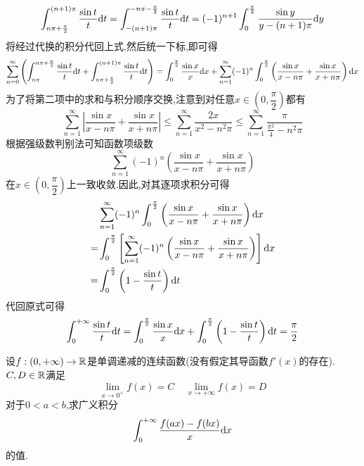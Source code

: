 \documentclass{ctexart}
\begin{document}
\begin{solution}
\begin{enumerate}[label=\tbf{(\arabic*)},topsep=0pt,parsep=0pt,itemsep=0pt,partopsep=0pt]
            \[\int_{n\pi+\frac\pi2}^{(n+1)\pi}\dfrac{\sin t}{t}\mathrm{d} t
            =\int^{-n\pi-\frac\pi2}_{-(n+1)\pi}\dfrac{\sin t}{t}\mathrm{d} t
            =(-1)^{n+1}\int_0^{\frac\pi2}\dfrac{\sin y}{y-(n+1)\pi}\mathrm{d} y\]
            将经过代换的积分代回上式,然后统一下标,即可得
            \[\sum_{n=0}^{\infty}\left(\int_{n\pi}^{n\pi+\frac\pi2}\dfrac{\sin t}{t}\mathrm{d} t+\int_{n\pi+\frac\pi2}^{(n+1)\pi}\dfrac{\sin t}{t}\mathrm{d} t\right)
            =\int_0^{\frac\pi2}\dfrac{\sin x}{x}\mathrm{d} x+\sum_{n=1}^{\infty}(-1)^n\int_0^{\frac\pi2}\left(\dfrac{\sin x}{x-n\pi}+\dfrac{\sin x}{x+n\pi}\right)\mathrm{d} x\]
            为了将第二项中的求和与积分顺序交换,注意到对任意$x\in\left(0,\dfrac\pi2\right)$都有
            \[\sum_{n=1}^{\infty}\left|\dfrac{\sin x}{x-n\pi}+\dfrac{\sin x}{x+n\pi}\right|
            \leqslant\sum_{n=1}^{\infty}\dfrac{2x}{x^2-n^2\pi}
            \leqslant\sum_{n=1}^{\infty}\dfrac{\pi}{\frac{\pi^2}{4}-n^2\pi}\]
            根据强级数判别法可知函数项级数
            \[\sum_{n=1}^{\infty}(-1)^n\left(\dfrac{\sin x}{x-n\pi}+\dfrac{\sin x}{x+n\pi}\right)\]
            在$x\in\left(0,\dfrac\pi2\right)$上一致收敛.因此,对其逐项求积分可得
            \[\begin{aligned}
                &\sum_{n=1}^{\infty}(-1)^n\int_0^{\frac\pi2}\left(\dfrac{\sin x}{x-n\pi}+\dfrac{\sin x}{x+n\pi}\right)\mathrm{d} x \\
                =&\int_{0}^{\frac\pi2}\left[\sum_{n=1}^{\infty}(-1)^n\left(\dfrac{\sin x}{x-n\pi}+\dfrac{\sin x}{x+n\pi}\right)\right]\mathrm{d} x \\
                =&\int_0^{\frac\pi2}\left(1-\dfrac{\sin t}{t}\right)\mathrm{d} t
            \end{aligned}\]
            代回原式可得
            \[\int_0^{+\infty}\dfrac{\sin t}{t}\mathrm{d} t=\int_0^{\frac\pi2}\dfrac{\sin x}{x}\mathrm{d} x+\int_0^{\frac\pi2}\left(1-\dfrac{\sin t}{t}\right)\mathrm{d} t=\dfrac\pi2\]
            
    \end{enumerate}
\end{solution}
\begin{problem}[7.(10\songti{分})]
    设$f:(0,+\infty)\to\mathbb{R}$是单调递减的连续函数(没有假定其导函数$f'(x)$的存在).%
    $C,D\in\mathbb{R}$满足
    \[\lim_{x\to0^+}f(x)=C\ \ \ \ \ \lim_{x\to+\infty}f(x)=D\]
    对于$0<a<b$,求广义积分
    \[\int_0^{+\infty}\dfrac{f(ax)-f(bx)}{x}\mathrm{d} x\]
    的值.

\end{problem}
\end{document}
